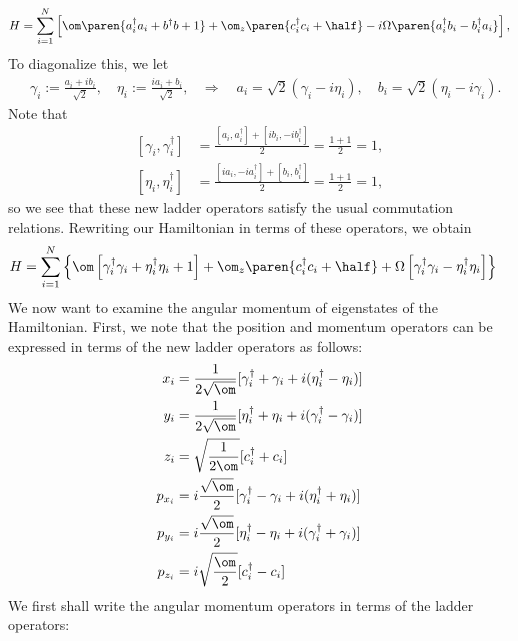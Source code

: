 \documentclass{article}
\begin{document}
$$
\begin{aligned}
H
&= \sum_{i=1}^N \left[\om\paren{a_i^\dagger a_i + b^\dagger b + 1} +  \om_z\paren{c_i^\dagger c_i + \half} - i\Omega\paren{a_i^\dagger b_i - b_i^\dagger a_i}\right],\\
\end{aligned}
$$
To diagonalize this, we let
$$
\begin{aligned}
&\gamma_i := \frac{a_i + i b_i}{\sqrt{2}}, \quad \eta_i := \frac{i a_i + b_i}{\sqrt{2}},
&\Rightarrow\quad a_i = \sqrt{2}(\gamma_i - i \eta_i), \quad b_i = \sqrt{2}(\eta_i - i \gamma_i).
\end{aligned}
$$
Note that
$$
\begin{aligned}
\left[\gamma_i,\gamma_i^\dagger\right] &=
  \frac{\left[a_i,a_i^\dagger\right] +
  \left[ib_i,-ib_i^\dagger\right]}{2} = \frac{1+1}{2} = 1,\\
\left[\eta_i,\eta_i^\dagger\right] &=
  \frac{\left[i a_i,-i a_i^\dagger\right] +
  \left[b_i,b_i^\dagger\right]}{2} = \frac{1+1}{2} = 1,
\end{aligned}
$$
so we see that these new ladder operators satisfy the usual
commutation relations.  Rewriting our Hamiltonian in terms of these
operators, we obtain
$$
\begin{aligned}
H
&=  \sum_{i=1}^N \left\{\om\left[\gamma_i^\dagger\gamma_i + \eta_i^\dagger\eta_i + 1\right] + \om_z\paren{c_i^\dagger c_i + \half}+ \Omega\left[\gamma_i^\dagger\gamma_i - \eta_i^\dagger\eta_i\right]\right\}
\end{aligned}
$$
We now want to examine the angular momentum of eigenstates of the Hamiltonian.
First, we note that the position and momentum operators can be expressed in terms of the new ladder operators as follows:
$$
\begin{aligned}[]
x_i &= \frac{1}{2\sqrt{\om}}[\gamma_i^\dagger + \gamma_i+ i(\eta_i^\dagger-\eta_i)]\\
y_i &= \frac{1}{2\sqrt{\om}}[\eta_i^\dagger + \eta_i+ i(\gamma_i^\dagger-\gamma_i)]\\
z_i &= \sqrt{\frac{1}{2\om}}[c_i^\dagger + c_i]\\
p_{x_i} &= i\frac{\sqrt{\om}}{2}[\gamma_i^\dagger - \gamma_i + i(\eta_i^\dagger + \eta_i)]\\
p_{y_i} &=i\frac{\sqrt{\om}}{2}[\eta_i^\dagger - \eta_i + i(\gamma_i^\dagger +\gamma_i)]\\
p_{z_i} &=i\sqrt{\frac{\om}{2}}[c_i^\dagger - c_i]\\
\end{aligned}
$$
We first shall write the angular momentum operators in terms of the ladder operators:
\end{document}
